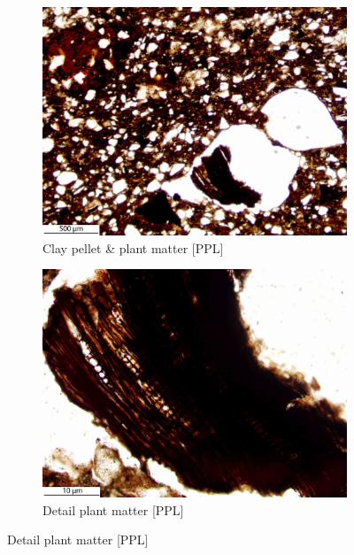 \documentclass[a4paper]{article}
\begin{document}
\begin{figure}[H]
\begin{subfigure}[t]{.32\textwidth}
		\includegraphics[width=\textwidth]{ThinSections/10-2_4x_PPL.jpg}
		\caption{Clay pellet \& plant matter [PPL]}
	\end{subfigure}\hspace{.1em}\hfill
	\begin{subfigure}[t]{.32\textwidth}
		\includegraphics[width=\textwidth]{ThinSections/10-2_20x_PPL.jpg}
		\caption{Detail plant matter [PPL]}
	\end{subfigure}\hspace{.1em}\hfill

\end{figure}
\end{document}
